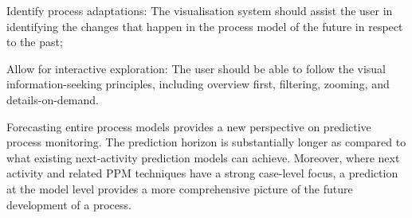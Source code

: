 \begin{requidescr}
	\item[Identify process adaptations:\namedlabel{req:adaptation}] The visualisation system should assist the user in identifying the changes that happen in the process model of the future in respect to the past;
	\item[Allow for interactive exploration:\namedlabel{req:interactive}] The user should be able to follow the visual information-seeking principles, including overview first, filtering, zooming, and details-on-demand.
\end{requidescr} %

Forecasting entire process models provides a new perspective on predictive process monitoring. 
The prediction horizon is substantially longer as compared to what existing next-activity prediction models can achieve. Moreover, where next activity and related PPM techniques have a strong case-level focus, a prediction at the model level provides a more comprehensive picture of the future development of a process.


